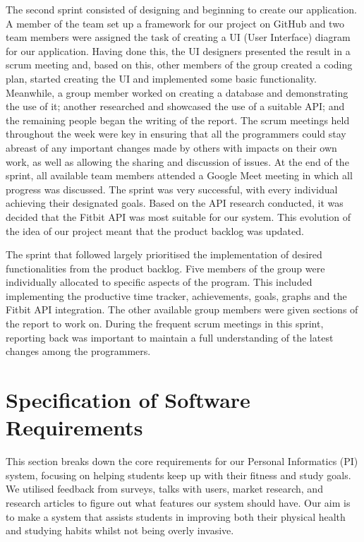 \documentclass[12pt]{article}
\begin{document}
The second sprint consisted of designing and beginning to create our application. A member of the team set up a framework for our project on GitHub and two team members were assigned the task of creating a UI (User Interface) diagram for our application. Having done this, the UI designers presented the result in a scrum meeting and, based on this, other members of the group created a coding plan, started creating the UI and implemented some basic functionality. Meanwhile, a group member worked on creating a database and demonstrating the use of it; another researched and showcased the use of a suitable API; and the remaining people began the writing of the report. The scrum meetings held throughout the week were key in ensuring that all the programmers could stay abreast of any important changes made by others with impacts on their own work, as well as allowing the sharing and discussion of issues. At the end of the sprint, all available team members attended a Google Meet meeting in which all progress was discussed. The sprint was very successful, with every individual achieving their designated goals. Based on the API research conducted, it was decided that the Fitbit API was most suitable for our system. This evolution of the idea of our project meant that the product backlog was updated.\par

The sprint that followed largely prioritised the implementation of desired functionalities from the product backlog. Five members of the group were individually allocated to specific aspects of the program. This included implementing the productive time tracker, achievements, goals, graphs and the Fitbit API integration. The other available group members were given sections of the report to work on. During the frequent scrum meetings in this sprint, reporting back was important to maintain a full understanding of the latest changes among the programmers.


\newpage
\section{Specification of Software Requirements}

This section breaks down the core requirements for our Personal Informatics
(PI) system, focusing on helping students keep up with their fitness and study
goals. We utilised feedback from surveys, talks with users, market research,
and research articles to figure out what features our system should have. Our
aim is to make a system that assists students in improving both their physical
health and studying habits whilst not being overly invasive.
\end{document}
